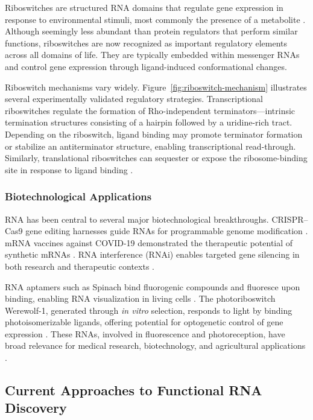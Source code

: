 \documentclass{article}
\begin{document}
Riboswitches are structured RNA domains that regulate gene expression in response to environmental stimuli, most commonly the presence of a metabolite \parencite{Breaker2023}.
Although seemingly less abundant than protein regulators that perform similar functions, riboswitches are now recognized as important regulatory elements across all domains of life.
They are typically embedded within messenger RNAs and control gene expression through ligand-induced conformational changes.

Riboswitch mechanisms vary widely.
Figure~\ref{fig:riboswitch-mechanism} illustrates several experimentally validated regulatory strategies.
Transcriptional riboswitches regulate the formation of Rho-independent terminators—intrinsic termination structures consisting of a hairpin followed by a uridine-rich tract.
Depending on the riboswitch, ligand binding may promote terminator formation or stabilize an antiterminator structure, enabling transcriptional read-through.
Similarly, translational riboswitches can sequester or expose the ribosome-binding site in response to ligand binding \parencite{Breaker2023}.

\subsubsection*{Biotechnological Applications}

RNA has been central to several major biotechnological breakthroughs.
CRISPR--Cas9 gene editing harnesses guide RNAs for programmable genome modification \parencite{Jinek2012}.
mRNA vaccines against COVID-19 demonstrated the therapeutic potential of synthetic mRNAs \parencite{Polack2020}.
RNA interference (RNAi) enables targeted gene silencing in both research and therapeutic contexts \parencite{Fire1998}.

RNA aptamers such as Spinach bind fluorogenic compounds and fluoresce upon binding, enabling RNA visualization in living cells \parencite{Paige2011}.
The photoriboswitch Werewolf-1, generated through \emph{in vitro} selection, responds to light by binding photoisomerizable ligands, offering potential for optogenetic control of gene expression \parencite{Rotstan2020}.
These RNAs, involved in fluorescence and photoreception, have broad relevance for medical research, biotechnology, and agricultural applications \parencite{Micura2020}.

\subsection{Current Approaches to Functional RNA Discovery}
\end{document}
